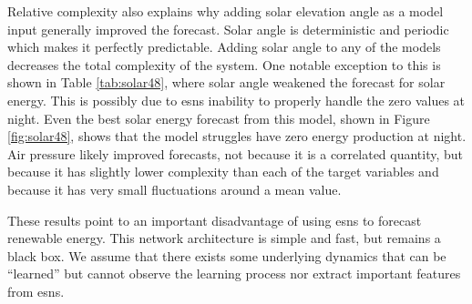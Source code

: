 Relative complexity also explains why adding solar elevation angle as a model
input generally improved the forecast. Solar angle is deterministic and
periodic which makes it perfectly predictable. Adding solar angle to any of the
models decreases the total complexity of the system. One notable exception to
this is shown in Table \ref{tab:solar48}, where solar angle weakened the
forecast for solar energy. This is possibly due to \glspl{esn} inability to
properly handle the zero values at night. Even the best solar energy forecast
from this model, shown in Figure \ref{fig:solar48}, shows that the model
struggles have zero energy production at night. Air pressure likely improved
forecasts, not because it is a correlated quantity, but because it has slightly
lower complexity than each of the target variables and because it has very
small fluctuations around a mean value.

These results point to an important disadvantage of using \glspl{esn} to
forecast renewable energy. This network architecture is simple and fast, but
remains a black box. We assume that there exists some underlying dynamics that
can be ``learned'' but cannot observe the learning process nor extract important
features from \glspl{esn}.


